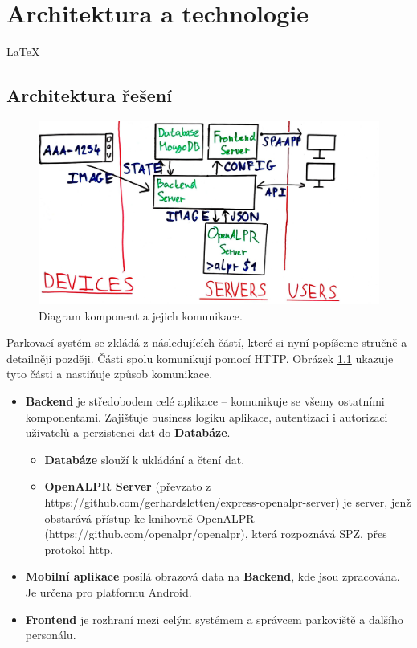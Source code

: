 
\chapter{Architektura a technologie} \label{archtech}

\LaTeX
\section{Architektura řešení} \label{architektura_reseni}

\begin{figure} \centering
  \includegraphics[width=145mm]{../img/architecture_drawing.jpg}
  \caption{Diagram komponent a jejich komunikace.}
  \label{fig:architecture_drawing}
\end{figure}

Parkovací systém se zkládá z následujících částí, které si nyní popíšeme stručně a detailněji později.
Části spolu komunikují pomocí HTTP.
Obrázek \ref{fig:architecture_drawing} ukazuje tyto části a nastiňuje způsob komunikace.

\begin{itemize}
  \item \textbf{Backend} je středobodem celé aplikace -- komunikuje se všemy ostatními komponentami.
        Zajišťuje business logiku aplikace, autentizaci i autorizaci uživatelů a perzistenci dat do \textbf{Databáze}.
  \begin{itemize}
    \item \textbf{Databáze} slouží k ukládání a čtení dat.
    \item \textbf{OpenALPR Server} (převzato z https://github.com/gerhardsletten/express-openalpr-server) je server, jenž obstarává přístup
          ke knihovně OpenALPR (https://github.com/openalpr/openalpr), která rozpoznává SPZ, přes protokol http.
  \end{itemize}
  \item \textbf{Mobilní aplikace} posílá obrazová data na \textbf{Backend}, kde jsou zpracována. Je určena pro platformu Android.
  \item \textbf{Frontend} je rozhraní mezi celým systémem a správcem parkoviště a dalšího personálu.
\end{itemize}

